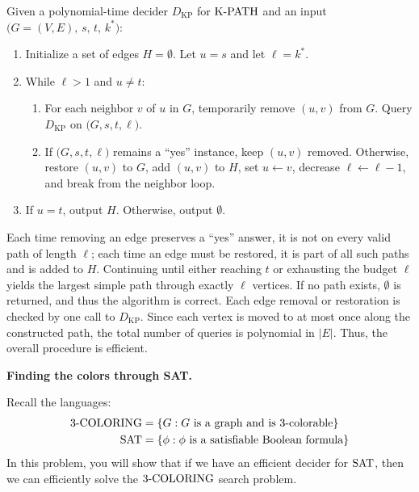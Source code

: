 \documentclass[11pt,addpoints,answers]{exam}
\begin{document}
\begin{questions}
\begin{parts}
    \begin{solution}
    Given a polynomial-time decider \(D_{\text{KP}}\) for \(\text{K-PATH}\) and an input \(\bigl(G=(V,E),\,s,\,t,\,k^*\bigr)\): 
    \begin{enumerate} 
    \item Initialize a set of edges \(H = \emptyset\). Let \(u = s\) and let \(\ell = k^*\). 
    \item While \(\ell > 1\) and \(u \neq t\): \begin{enumerate} 
    \item For each neighbor \(v\) of \(u\) in \(G\), temporarily remove \((u,v)\) from \(G\). Query \(D_{\text{KP}}\)\(\) on \(\bigl(G, s, t, \ell\bigr)\). 
    \item If \(\bigl(G, s, t, \ell\bigr)\) remains a “yes” instance, keep \((u,v)\) removed. Otherwise, restore \((u,v)\) to \(G\), add \((u,v)\) to \(H\), set \(u \leftarrow v\), decrease \(\ell \leftarrow \ell - 1\), and break from the neighbor loop. 
    \end{enumerate} 
    \item If \(u = t\), output \(H\). Otherwise, output \(\emptyset\). 
    \end{enumerate} 
    Each time removing an edge preserves a “yes” answer, it is not on every valid path of length \(\ell\); each time an edge must be restored, it is part of all such paths and is added to \(H\). Continuing until either reaching \(t\) or exhausting the budget \(\ell\) yields the largest simple path through exactly \(\ell\) vertices. If no path exists, \(\emptyset\) is returned, and thus the algorithm is correct.
    Each edge removal or restoration is checked by one call to \(D_{\text{KP}}\). Since each vertex is moved to at most once along the constructed path, the total number of queries is polynomial in \(|E|\). Thus, the overall procedure is efficient. 
    \end{solution}

\end{parts}

\pagebreak
\question [12] \textbf{Finding the colors through SAT.}
\newcommand{\TCOLOR}{\cproblem{3-COLORING}}

    Recall the languages:
    \begin{align*}
        \TCOLOR &= \set{G: \text{$G$ is a graph and is 3-colorable}} \\
        \SAT &= \set{\phi: \text{$\phi$ is a satisfiable Boolean formula}}
    \end{align*}
    In this problem, you will show that if we have an efficient decider for $\text{SAT}$, then we can efficiently solve the $\TCOLOR$ search problem. 


\end{questions}
\end{document}
